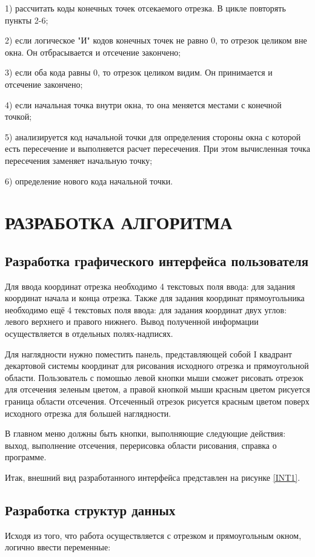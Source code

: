 1)	рассчитать коды конечных точек отсекаемого отрезка. В цикле повторять пункты 2-6;

2)	если логическое "И" кодов конечных точек не равно 0, то отрезок целиком вне окна. Он отбрасывается и отсечение закончено;

3)	если оба кода равны 0, то отрезок целиком видим. Он принимается и отсечение закончено;

4)	если начальная точка внутри окна, то она меняется местами с конечной точкой;

5)	анализируется код начальной точки для определения стороны окна с которой есть пересечение и выполняется расчет пересечения. При этом вычисленная точка пересечения заменяет начальную точку;

6)	определение нового кода начальной точки.


\section{РАЗРАБОТКА АЛГОРИТМА}
\subsection{Разработка графического интерфейса пользователя}
Для ввода координат отрезка необходимо 4 текстовых поля ввода: для задания координат начала и конца отрезка. Также для задания координат прямоугольника необходимо ещё 4 текстовых поля ввода: для задания координат двух углов: левого верхнего и правого нижнего. Вывод полученной информации осуществляется в отдельных полях-надписях.

Для наглядности нужно поместить панель, представляющей собой I квадрант декартовой системы координат для рисования исходного отрезка и прямоугольной области. Пользователь с помошью левой кнопки мыши сможет рисовать отрезок для отсечения зеленым цветом, а правой кнопкой мыши красным цветом рисуется граница области отсечения. Отсеченный отрезок рисуется красным цветом поверх исходного отрезка для большей наглядности.

В главном меню должны быть кнопки, выполняющие следующие действия: выход, выполнение отсечения, перерисовка области рисования, справка о программе.

Итак, внешний вид разработанного интерфейса представлен на рисунке \ref{INT1}.
\subsection{Разработка структур данных}
Исходя из того, что работа осуществляется с отрезком и прямоугольным
окном, логично ввести переменные:

